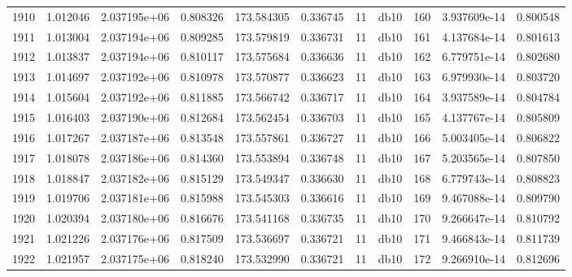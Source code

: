 \begin{tabular}{lrrrrrrlrrr}
1910 &    1.012046 &        2.037195e+06 &  0.808326 &              173.584305 &    0.336745 &      11 &         db10 &    160 &   3.937609e-14 &      0.800548 \\
1911 &    1.013004 &        2.037194e+06 &  0.809285 &              173.579819 &    0.336731 &      11 &         db10 &    161 &   4.137684e-14 &      0.801613 \\
1912 &    1.013837 &        2.037194e+06 &  0.810117 &              173.575684 &    0.336636 &      11 &         db10 &    162 &   6.779751e-14 &      0.802680 \\
1913 &    1.014697 &        2.037192e+06 &  0.810978 &              173.570877 &    0.336623 &      11 &         db10 &    163 &   6.979930e-14 &      0.803720 \\
1914 &    1.015604 &        2.037192e+06 &  0.811885 &              173.566742 &    0.336717 &      11 &         db10 &    164 &   3.937589e-14 &      0.804784 \\
1915 &    1.016403 &        2.037190e+06 &  0.812684 &              173.562454 &    0.336703 &      11 &         db10 &    165 &   4.137767e-14 &      0.805809 \\
1916 &    1.017267 &        2.037187e+06 &  0.813548 &              173.557861 &    0.336727 &      11 &         db10 &    166 &   5.003405e-14 &      0.806822 \\
1917 &    1.018078 &        2.037186e+06 &  0.814360 &              173.553894 &    0.336748 &      11 &         db10 &    167 &   5.203565e-14 &      0.807850 \\
1918 &    1.018847 &        2.037182e+06 &  0.815129 &              173.549347 &    0.336630 &      11 &         db10 &    168 &   6.779743e-14 &      0.808823 \\
1919 &    1.019706 &        2.037181e+06 &  0.815988 &              173.545303 &    0.336616 &      11 &         db10 &    169 &   9.467088e-14 &      0.809790 \\
1920 &    1.020394 &        2.037180e+06 &  0.816676 &              173.541168 &    0.336735 &      11 &         db10 &    170 &   9.266647e-14 &      0.810792 \\
1921 &    1.021226 &        2.037176e+06 &  0.817509 &              173.536697 &    0.336721 &      11 &         db10 &    171 &   9.466843e-14 &      0.811739 \\
1922 &    1.021957 &        2.037175e+06 &  0.818240 &              173.532990 &    0.336721 &      11 &         db10 &    172 &   9.266910e-14 &      0.812696 \\

\end{tabular}
